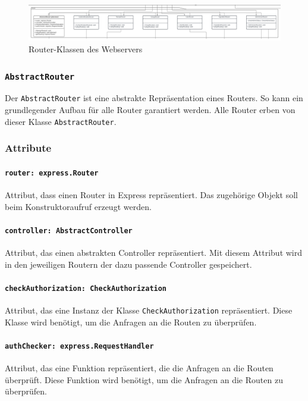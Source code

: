 \documentclass{entwurfsheft}
\begin{document}
\begin{figure}[htp]
    \centering
    \includegraphics[width = 1\textwidth]{images/webserver/router.pdf}
    \caption{Router-Klassen des Webservers}
    \label{fig:router}
\end{figure}

\subsubsection{\texttt{AbstractRouter}}\label{sec:AbstractRouter}
Der \texttt{AbstractRouter} ist eine abstrakte Repräsentation eines Routers. So kann ein grundlegender Aufbau für alle Router garantiert werden. Alle Router erben von dieser Klasse \texttt{AbstractRouter}.
\subsubsection*{Attribute}
\paragraph{\texttt{router: express.Router}}
Attribut, dass einen Router in Express repräsentiert. Das zugehörige Objekt soll beim Konstruktoraufruf erzeugt werden.
\paragraph{\texttt{controller: AbstractController}}
Attribut, das einen abstrakten Controller repräsentiert. Mit diesem Attribut wird in den jeweiligen Routern der dazu passende Controller gespeichert.
\paragraph{\texttt{checkAuthorization: CheckAuthorization}}
Attribut, das eine Instanz der Klasse \texttt{CheckAuthorization} repräsentiert. Diese Klasse wird benötigt, um die Anfragen an die Routen zu überprüfen.
\paragraph{\texttt{authChecker: express.RequestHandler}}
Attribut, das eine Funktion repräsentiert, die die Anfragen an die Routen überprüft. Diese Funktion wird benötigt, um die Anfragen an die Routen zu überprüfen.
\end{document}
